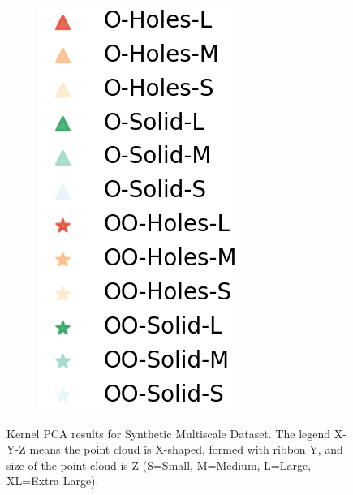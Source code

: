 \documentclass[10pt]{article}
\begin{document}
\begin{figure}[H]
\begin{subfigure}[h]{0.08\textwidth}
        \includegraphics[width=\linewidth]{ms_legend}
    \end{subfigure}%
    \caption{Kernel PCA results for Synthetic Multiscale Dataset. The legend X-Y-Z means the point cloud is X-shaped, formed with ribbon Y, and size of the point cloud is Z (S=Small, M=Medium, L=Large, XL=Extra Large).}
    \label{fig:ms_kernels}
\end{figure}
\end{document}
